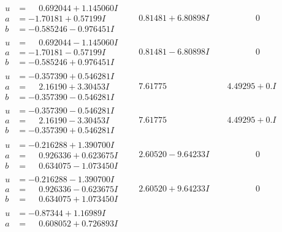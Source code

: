 \documentclass[1p]{elsarticle_modified}
\theoremstyle{definition}
\begin{document}
$$\begin{array}{c|c|c}
 \hline 
\begin{aligned}
u &= \phantom{-}0.692044 + 1.145060 I \\
a &= -1.70181 + 0.57199 I \\
b &= -0.585246 - 0.976451 I\end{aligned}
 & \phantom{-}0.81481 + 6.80898 I & \phantom{-0.000000 } 0 \\ \hline\begin{aligned}
u &= \phantom{-}0.692044 - 1.145060 I \\
a &= -1.70181 - 0.57199 I \\
b &= -0.585246 + 0.976451 I\end{aligned}
 & \phantom{-}0.81481 - 6.80898 I & \phantom{-0.000000 } 0 \\ \hline\begin{aligned}
u &= -0.357390 + 0.546281 I \\
a &= \phantom{-}2.16190 + 3.30453 I \\
b &= -0.357390 - 0.546281 I\end{aligned}
 & \phantom{-}7.61775\phantom{ +0.000000I} & \phantom{-}4.49295 + 0. I\phantom{ +0.000000I} \\ \hline\begin{aligned}
u &= -0.357390 - 0.546281 I \\
a &= \phantom{-}2.16190 - 3.30453 I \\
b &= -0.357390 + 0.546281 I\end{aligned}
 & \phantom{-}7.61775\phantom{ +0.000000I} & \phantom{-}4.49295 + 0. I\phantom{ +0.000000I} \\ \hline\begin{aligned}
u &= -0.216288 + 1.390700 I \\
a &= \phantom{-}0.926336 + 0.623675 I \\
b &= \phantom{-}0.634075 - 1.073450 I\end{aligned}
 & \phantom{-}2.60520 - 9.64233 I & \phantom{-0.000000 } 0 \\ \hline\begin{aligned}
u &= -0.216288 - 1.390700 I \\
a &= \phantom{-}0.926336 - 0.623675 I \\
b &= \phantom{-}0.634075 + 1.073450 I\end{aligned}
 & \phantom{-}2.60520 + 9.64233 I & \phantom{-0.000000 } 0 \\ \hline\begin{aligned}
u &= -0.87344 + 1.16989 I \\
a &= \phantom{-}0.608052 + 0.726893 I \\

\end{aligned}
\end{array}$$
\end{document}
